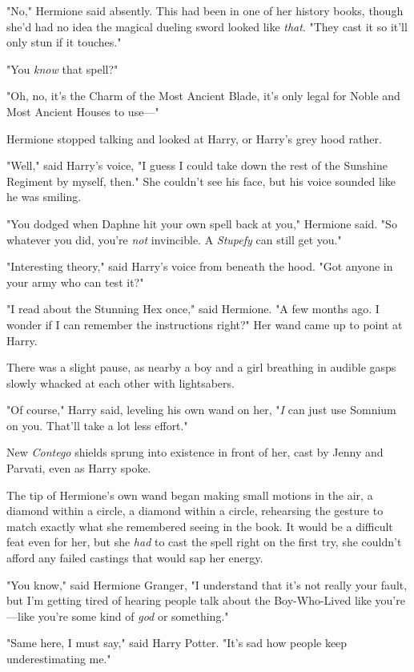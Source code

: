 "No," Hermione said absently. This had been in one of her history books, though
she'd had no idea the magical dueling sword looked like \emph{that}. "They cast
it so it'll only stun if it touches."

"You \emph{know} that spell?"

"Oh, no, it's the Charm of the Most Ancient Blade, it's only legal for Noble
and Most Ancient Houses to use—"

Hermione stopped talking and looked at Harry, or Harry's grey hood rather.

"Well," said Harry's voice, "I guess I could take down the rest of the Sunshine
Regiment by myself, then." She couldn't see his face, but his voice sounded
like he was smiling.

"You dodged when Daphne hit your own spell back at you," Hermione said. "So
whatever you did, you're \emph{not} invincible. A \emph{Stupefy} can still get
you."

"Interesting theory," said Harry's voice from beneath the hood. "Got anyone in
your army who can test it?"

"I read about the Stunning Hex once," said Hermione. "A few months ago. I
wonder if I can remember the instructions right?" Her wand came up to point at
Harry.

There was a slight pause, as nearby a boy and a girl breathing in audible gasps
slowly whacked at each other with lightsabers.

"Of course," Harry said, leveling his own wand on her, "\emph{I} can just use
Somnium on you. That'll take a lot less effort."

New \emph{Contego} shields sprung into existence in front of her, cast by Jenny
and Parvati, even as Harry spoke.

The tip of Hermione's own wand began making small motions in the air, a diamond
within a circle, a diamond within a circle, rehearsing the gesture to match
exactly what she remembered seeing in the book. It would be a difficult feat
even for her, but she \emph{had} to cast the spell right on the first try, she
couldn't afford any failed castings that would sap her energy.

"You know," said Hermione Granger, "I understand that it's not really your
fault, but I'm getting tired of hearing people talk about the Boy-Who-Lived
like you're—like you're some kind of \emph{god} or something."

"Same here, I must say," said Harry Potter. "It's sad how people keep
underestimating me."

